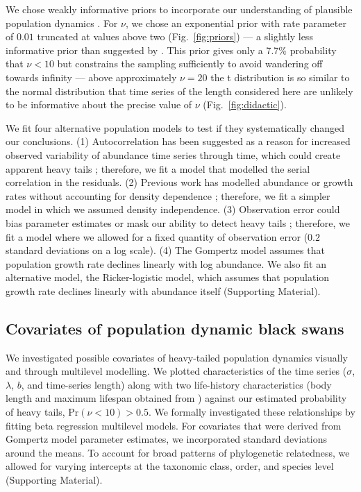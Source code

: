 We chose weakly informative priors to incorporate our understanding of
plausible population dynamics \citep[Supporting Material]{gelman2014}. For
$\nu$, we chose an exponential prior with rate parameter of $0.01$ truncated at
values above two (Fig.~\ref{fig:priors}) --- a slightly less informative prior
than suggested by \citet{fernandez1998}. This prior gives only a 7.7\%
probability that $\nu < 10$ but constrains the sampling sufficiently to avoid
wandering off towards infinity --- above approximately $\nu = 20$ the
t distribution is so similar to the normal distribution that time series of the
length considered here are unlikely to be informative about the precise value
of $\nu$ (Fig.~\ref{fig:didactic}).

We fit four alternative population models to test if they systematically
changed our conclusions. (1) Autocorrelation has been suggested as a reason for
increased observed variability of abundance time series through time, which
could create apparent heavy tails \citep{inchausti2002}; therefore, we fit
a model that modelled the serial correlation in the residuals. (2) Previous
work has modelled abundance or growth rates without accounting for density
dependence \citep{halley2002,segura2013}; therefore, we fit a simpler model in
which we assumed density independence. (3) Observation error could bias
parameter estimates \citep{knape2012} or mask our ability to detect heavy tails
\citep{ward2007}; therefore, we fit a model where we allowed for a fixed
quantity of observation error ($0.2$ standard deviations on a log scale). (4)
The Gompertz model assumes that population growth rate declines linearly with
log abundance. We also fit an alternative model, the Ricker-logistic model,
which assumes that population growth rate declines linearly with abundance
itself (Supporting Material).

\subsection{Covariates of population dynamic black swans}

We investigated possible covariates of heavy-tailed population dynamics
visually and through multilevel modelling. We plotted characteristics of the
time series ($\sigma$, $\lambda$, $b$, and time-series length) along with two
life-history characteristics (body length and maximum lifespan obtained from
\citet{brook2006a}) against our estimated probability of heavy tails, Pr$(\nu
< 10) > 0.5$. We formally investigated these relationships by fitting beta
regression multilevel models. For covariates that were derived from Gompertz
model parameter estimates, we incorporated standard deviations around the
means. To account for broad patterns of phylogenetic relatedness, we allowed
for varying intercepts at the taxonomic class, order, and species level
(Supporting Material).

